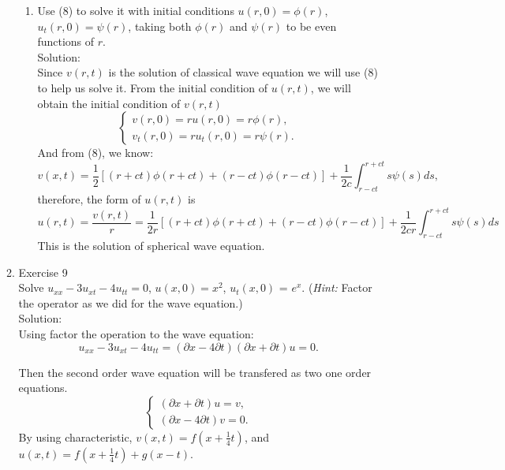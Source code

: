 \documentclass[12pt]{article}%
\begin{document}
\begin{enumerate}
\begin{enumerate}
\begin{enumerate}
            \item Use (8) to solve it with initial conditions $u\left(r,0\right) = \phi\left(r\right)$, $u_t\left(r,0\right) = \psi\left(r\right)$, taking both $\phi\left(r\right)$ and $\psi\left(r\right)$ to be even functions of $r$. \smallskip \\
            Solution:\\
            Since $v(r,t)$ is the solution of classical wave equation we will use (8) to help us solve it.
            From the initial condition of $u(r,t)$, we will obtain the initial condition of $v(r,t)$
            \begin{equation*}
                \begin{cases}
                    v(r,0)=ru(r,0)=r\phi(r),
                    \\
                    v_{t}(r,0)=ru_{t}(r,0)=r\psi(r).
                \end{cases}
            \end{equation*}
            And from (8), we know:
       \[v(x,t)=\frac{1}{2}[(r+ct)\phi(r+ct)+(r-ct)\phi(r-ct)]+\frac{1}{2c}\int_{r-ct}^{r+ct}s\psi(s)ds,\] therefore, the form of $u(r,t)$ is 
          \[u(r,t)=\frac{v(r,t)}{r}=\frac{1}{2r}[(r+ct)\phi(r+ct)+(r-ct)\phi(r-ct)]+\frac{1}{2cr}\int_{r-ct}^{r+ct}s\psi(s)ds\]
          This is the solution of spherical wave equation.
        \end{enumerate}
        
        \item Exercise 9 \smallskip \\
        Solve $u_{xx} - 3 u_{xt} - 4u_{tt} = 0$, $u\left(x,0\right) = x^2$, $u_t\left(x,0\right)$ = $e^x$. (\emph{Hint:} Factor the operator as we did for the wave equation.) \smallskip \\
        Solution:\\
        Using factor the operation to the wave equation: 
        \[u_{xx} - 3 u_{xt} - 4u_{tt}=(\partial x -4\partial t)(\partial x + \partial t) u=0.\]

        Then the second order wave equation will be transfered as two one order equations.
        \begin{equation*}
            \begin{cases}
                (\partial x + \partial t) u=v,
                \\
                (\partial x -4\partial t)v=0.
            \end{cases}
        \end{equation*}
        By using characteristic, $v(x,t)=f(x+\frac{1}{4}t)$, and $u(x,t)=f(x+\frac{1}{4}t)+g(x-t).$ 
        

\end{enumerate}
\end{enumerate}
\end{document}

